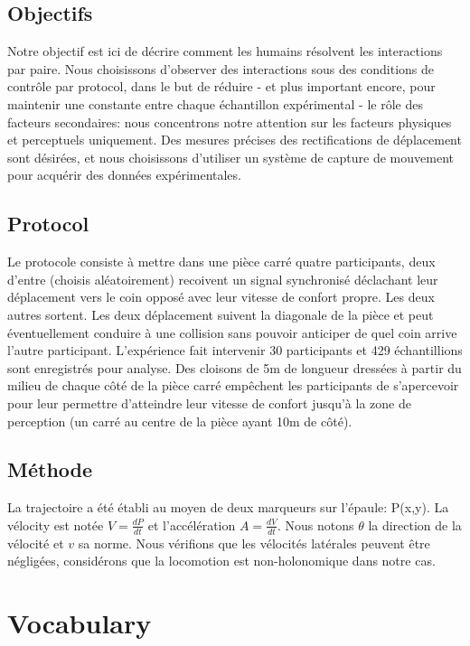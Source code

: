 \documentclass[11pt]{article}
\begin{document}
\subsection*{Objectifs}

Notre objectif est ici de décrire comment les humains résolvent les interactions par paire. Nous choisissons d'observer des interactions sous des conditions de contrôle par protocol, dans le but de réduire - et plus important encore, pour maintenir une constante entre chaque échantillon expérimental - le rôle des facteurs secondaires: nous concentrons notre attention sur les facteurs physiques et perceptuels uniquement. Des mesures précises des rectifications de déplacement sont désirées, et nous choisissons d'utiliser un système de capture de mouvement pour acquérir des données expérimentales.

\subsection*{Protocol}

Le protocole consiste à mettre dans une pièce carré quatre participants, deux d'entre (choisis aléatoirement) recoivent un signal synchronisé déclachant leur déplacement vers le coin opposé avec leur vitesse de confort propre. Les deux autres sortent. Les deux déplacement suivent la diagonale de la pièce et peut éventuellement conduire à une collision sans pouvoir anticiper de quel coin arrive l'autre participant. L'expérience fait intervenir 30 participants et 429 échantillions sont enregistrés pour analyse. Des cloisons de \num{5}\si{\meter} de longueur dressées à partir du milieu de chaque côté de la pièce carré empêchent les participants de s'apercevoir pour leur permettre d'atteindre leur vitesse de confort jusqu'à la zone de perception (un carré au centre de la pièce ayant \num{10}\si{\meter} de côté).

\subsection*{Méthode}

La trajectoire a été établi au moyen de deux marqueurs sur l'épaule: P(x,y). La vélocity est notée $V = \frac{dP}{dt}$ et l'accélération $A = \frac{dV}{dt}$. Nous notons $\theta$ la direction de la vélocité et $v$ sa norme. Nous vérifions que les vélocités latérales peuvent être négligées, considérons que la locomotion est non-holonomique \cite{ARECHAVALETA-08} dans notre cas.

\section{Vocabulary}
\end{document}

